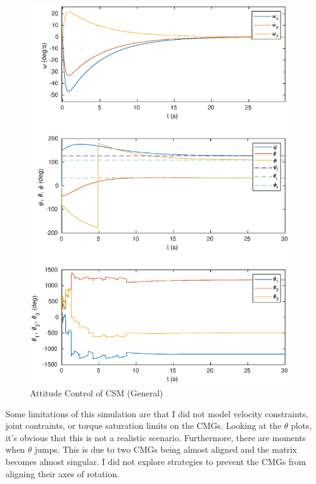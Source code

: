 \documentclass[a4paper]{article}
\begin{document}
\begin{figure}[H]
\begin{center}
  \includegraphics[scale=0.7]{task_f.eps}
\end{center}
\caption{Attitude Control of CSM (General)}
\label{fig:task_f}
\end{figure}

Some limitations of this simulation are that I did not model velocity constraints, joint contraints, or torque saturation limits on the CMGs. Looking at the $\theta$ plots, it's obvious that this is not a realistic scenario. Furthermore, there are moments when $\theta$ jumps. This is due to two CMGs being almost aligned and the matrix becomes almost singular. I did not explore strategies to prevent the CMGs from aligning their axes of rotation.
\end{document}
